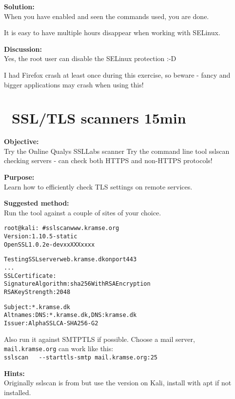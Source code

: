 \documentclass[a4paper,11pt,notitlepage]{report}
\begin{document}
{\bf Solution:}\\
When you have enabled and seen the commands used, you are done.

It is easy to have multiple hours disappear when working with SELinux.

{\bf Discussion:}\\
Yes, the root user can disable the SELinux protection :-D

I had Firefox crash at least once during this exercise, so beware - fancy and bigger applications may crash when using this!


\chapter{\faExclamationTriangle\ SSL/TLS scanners 15min}
\label{ex:sslscan}


{\bf Objective:}\\
Try the Online Qualys SSLLabs scanner 
Try the command line tool sslscan checking servers - can check both HTTPS and non-HTTPS protocols!

{\bf Purpose:}\\
Learn how to efficiently check TLS settings on remote services.

{\bf Suggested method:}\\
Run the tool against a couple of sites of your choice.

\begin{alltt}\small
root@kali:~# sslscan www.kramse.org
Version: 1.10.5-static
OpenSSL 1.0.2e-dev xx XXX xxxx

Testing SSL server web.kramse.dk on port 443
...
  SSL Certificate:
Signature Algorithm: sha256WithRSAEncryption
RSA Key Strength:    2048

Subject:  *.kramse.dk
Altnames: DNS:*.kramse.dk, DNS:kramse.dk
Issuer:   AlphaSSL CA - SHA256 - G2
\end{alltt}

Also run it against SMTPTLS if possible. Choose a mail server,\\
 \verb+mail.kramse.org+ can work like this:\\
\verb+sslscan   --starttls-smtp mail.kramse.org:25+

{\bf Hints:}\\
Originally sslscan is from  but use the version on Kali, install with apt if not installed.
\end{document}
